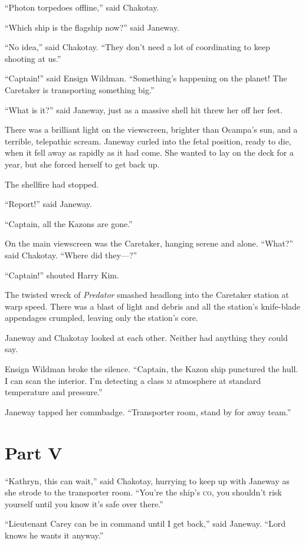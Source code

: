 \documentclass[twoside,letterpaper,12pt]{memoir}
\begin{document}
``Photon torpedoes offline,'' said Chakotay. 

``Which ship is the flagship now?'' said Janeway. 

``No idea,'' said Chakotay. ``They don't need a lot of coordinating to keep shooting at us.'' 

``Captain!'' said Ensign Wildman. ``Something's happening on the planet! The Caretaker is transporting something big.'' 

``What is it?'' said Janeway, just as a massive shell hit threw her off her feet. 

There was a brilliant light on the viewscreen, brighter than Ocampa's sun, and a terrible, telepathic scream. Janeway curled into the fetal position, ready to die, when it fell away as rapidly as it had come. She wanted to lay on the deck for a year, but she forced herself to get back up. 

The shellfire had stopped. 

``Report!'' said Janeway. 

``Captain, all the Kazons are gone.'' 

On the main viewscreen was the Caretaker, hanging serene and alone. ``What?'' said Chakotay. ``Where did they---?'' 

``Captain!'' shouted Harry Kim. 

The twisted wreck of \textit{Predator} smashed headlong into the Caretaker station at warp speed. There was a blast of light and debris and all the station's knife-blade appendages crumpled, leaving only the station's core. 

Janeway and Chakotay looked at each other. Neither had anything they could say. 

Ensign Wildman broke the silence. ``Captain, the Kazon ship punctured the hull. I can scan the interior. I'm detecting a class \textsc{m} atmosphere at standard temperature and pressure.'' 

Janeway tapped her commbadge. ``Transporter room, stand by for away team.''

\chapter*{Part V} 

``Kathryn, this can wait,'' said Chakotay, hurrying to keep up with Janeway as she strode to the transporter room. ``You're the ship's \textsc{co}, you shouldn't risk yourself until you know it's safe over there.'' 

``Lieutenant Carey can be in command until I get back,'' said Janeway. ``Lord knows he wants it anyway.'' 
\end{document}
